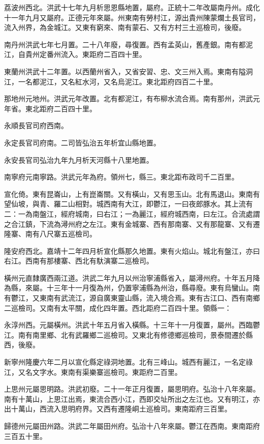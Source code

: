 荔波州西北。洪武十七年九月析思恩縣地置，屬府。正統十二年改屬南丹州。成化十一年九月又屬府。正德元年來屬。州東南有勞村江，源出貴州陳蒙爛土長官司，流入州界，為金城江。又東有窮來、南有蒙石、又有方村三土巡檢司，後廢。

南丹州洪武七年七月置。二十八年廢，尋復置。西有孟英山，舊產銀。南有都泥江，自貴州定番州流入。東距府二百四十里。

東蘭州洪武十二年置。以西蘭州省入，又省安習、忠、文三州入焉。東南有隘洞江，一名都泥江，又名紅水河，又名烏泥江。東北距府四百二十里。

那地州元地州。洪武元年改置。北有都泥江，有布柳水流合焉。南有那州，洪武元年省。東北距府二百四十里。

永順長官司府西南。

永定長官司府南。二司皆弘治五年析宜山縣地置。

永安長官司弘治九年九月析天河縣十八里地置。

南寧府元南寧路。洪武元年為府。領州七，縣三。東北距布政司千二百里。

宣化倚。東有昆崙山，上有崑崙關。又有橫山，又有思玉山。北有馬退山。東南有望仙坡，與青、羅二山相對。城西南有大江，即鬱江，一曰夜郎豚水。其上流有二：一為南盤江，經府城南，曰右江；一為麗江，經府城西南，曰左江。合流處謂之合江鎮，下流為潯州府之左江。東有金城寨、西有那南寨、又有那龍寨、又有遷隆寨、南有八尺寨五巡檢司。

隆安府西北。嘉靖十二年四月析宣化縣那久地置。東有火焰山。城北有盤江，亦曰右江。西南有那樓寨、西北有馱演寨二巡檢司。

橫州元直隸廣西兩江道。洪武二年九月以州治寧浦縣省入，屬潯州府。十年五月降為縣，來屬。十三年十一月復為州，仍置寧浦縣為州治，縣尋廢。東有烏蠻山。南有鬱江，又東南有武流江，源自廣東靈山縣，流入境合焉。東有古江口、西有南鄉二巡檢司。又南有太平關，成化四年置。西北距府二百四十里。領縣一：

永淳州西。元屬橫州。洪武十年五月省入橫縣。十三年十一月復置，屬州。西臨鬱江。南有南里鄉、北有武羅鄉二巡檢司。又東北有修德鄉巡檢司，景泰間遷於縣西，後廢。

新寧州隆慶六年二月以宣化縣定祿洞地置。北有三峰山。城西有麗江，一名定祿江，又名文字水。東南有渠樂寨巡檢司。東距府二百里。

上思州元屬思明路。洪武初廢。二十一年正月復置，屬思明府。弘治十八年來屬。南有十萬山，上思江出焉，東流合西小江，西即交址所出之左江也。又有明江，亦出十萬山，西流入思明府界。又西有遷隆峒土巡檢司。東南距府三百里。

歸德州元屬田州路。洪武二年屬田州府。弘治十八年來屬。鬱江在西南。東南距府三百五十里。

